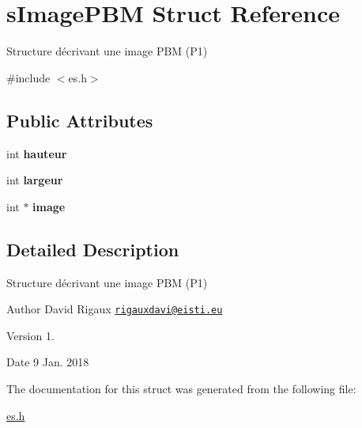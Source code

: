 \hypertarget{structs_image_p_b_m}{}\section{s\+Image\+P\+BM Struct Reference}
\label{structs_image_p_b_m}


Structure décrivant une image P\+BM (P1)  




{\ttfamily \#include $<$es.\+h$>$}

\subsection*{Public Attributes}
\begin{DoxyCompactItemize}
\item 
\mbox{\label{structs_image_p_b_m_aff8ecf2fea76d4a3cc707f6e44f71178}} 
int {\bfseries hauteur}
\item 
\mbox{\label{structs_image_p_b_m_a63e8395b6fef477836ca6e48ea9f00ba}} 
int {\bfseries largeur}
\item 
\mbox{\label{structs_image_p_b_m_a17fbc143b1f07ee75080d63a7650c6b5}} 
int $\ast$ {\bfseries image}
\end{DoxyCompactItemize}


\subsection{Detailed Description}
Structure décrivant une image P\+BM (P1) 

\begin{DoxyAuthor}{Author}
David Rigaux \href{mailto:rigauxdavi@eisti.eu}{\tt rigauxdavi@eisti.\+eu} 
\end{DoxyAuthor}
\begin{DoxyVersion}{Version}
1. 
\end{DoxyVersion}
\begin{DoxyDate}{Date}
9 Jan. 2018 
\end{DoxyDate}


The documentation for this struct was generated from the following file\+:\begin{DoxyCompactItemize}
\item 
\mbox{\hyperlink{es_8h}{es.\+h}}\end{DoxyCompactItemize}
